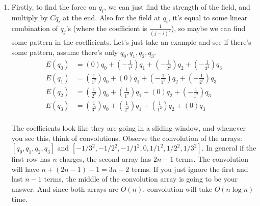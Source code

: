 \documentclass[12pt]{report}
\begin{document}
\begin{enumerate}[label=\textbf{\arabic*.}]
    \item Firstly, to find the force on $q_i$, we can just find the strength of the field, and multiply by $C q_i$ at the end. Also for the field at $q_i$, 
    it's equal to some linear combination of $q_j$'s (where the coefficient is $\frac{1}{(j-i)^2}$), so maybe we can find some pattern in the coefficients.
    Let's just take an example and see if there's some pattern, assume there's only $q_0, q_1, q_2, q_3$.
    \begin{align*}
        E(q_0) &= (0) q_0 + \left(-\frac{1}{1^2}\right) q_1 + \left(-\frac{1}{2^2}\right) q_2 + \left(-\frac{1}{3^2}\right) q_3 \\
        E(q_1) &= \left(\frac{1}{1^2}\right) q_0 + (0) q_1 + \left(-\frac{1}{1^2}\right) q_2 + \left(-\frac{1}{2^2}\right) q_3 \\
        E(q_2) &= \left(\frac{1}{2^2}\right) q_0 + \left(\frac{1}{1^2}\right) q_1 + (0) q_2 + \left(-\frac{1}{1^2}\right) q_3 \\
        E(q_3) &= \left(\frac{1}{3^2}\right) q_0 + \left(\frac{1}{2^2}\right) q_1 + \left(\frac{1}{1^2}\right) q_2 + (0) q_3 \\
    \end{align*}

    The coefficients look like they are going in a sliding window, and whenever you see this, think of convolutions. Observe the convolution
    of the arrays: $[q_0, q_1, q_2, q_3]$ and $[-1/3^2, -1/2^2, -1/1^2, 0, 1/1^2, 1/2^2, 1/3^2]$. In general if the first row has $n$ charges,
    the second array has $2n-1$ terms. The convolution will have $n + (2n-1) - 1 = 3n - 2$ terms. If you just ignore the first and last $n-1$ 
    terms, the middle of the convolution array is going to be your answer. And since both arrays are $O(n)$, convolution will take $O(n \log n)$
    time.
    
\end{enumerate}
\end{document}
